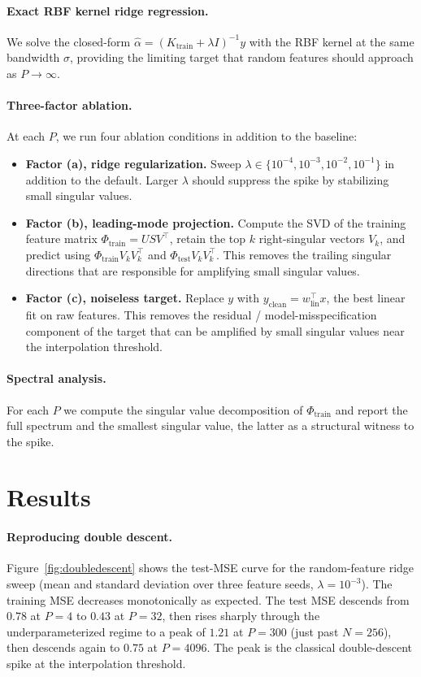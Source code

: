 \documentclass{article}
\begin{document}
\paragraph{Exact RBF kernel ridge regression.}
We solve the closed-form $\hat{\alpha} = (K_{\text{train}} + \lambda I)^{-1} y$ with the RBF kernel at the same bandwidth $\sigma$, providing the limiting target that random features should approach as $P \to \infty$.

\paragraph{Three-factor ablation.}
At each $P$, we run four ablation conditions in addition to the baseline:
\begin{itemize}
  \item \textbf{Factor (a), ridge regularization.} Sweep $\lambda \in \{10^{-4}, 10^{-3}, 10^{-2}, 10^{-1}\}$ in addition to the default. Larger $\lambda$ should suppress the spike by stabilizing small singular values.
  \item \textbf{Factor (b), leading-mode projection.} Compute the SVD of the training feature matrix $\Phi_{\text{train}} = U S V^\top$, retain the top $k$ right-singular vectors $V_k$, and predict using $\Phi_{\text{train}} V_k V_k^\top$ and $\Phi_{\text{test}} V_k V_k^\top$. This removes the trailing singular directions that are responsible for amplifying small singular values.
  \item \textbf{Factor (c), noiseless target.} Replace $y$ with $y_{\text{clean}} = w_{\text{lin}}^\top x$, the best linear fit on raw features. This removes the residual / model-misspecification component of the target that can be amplified by small singular values near the interpolation threshold.
\end{itemize}

\paragraph{Spectral analysis.}
For each $P$ we compute the singular value decomposition of $\Phi_{\text{train}}$ and report the full spectrum and the smallest singular value, the latter as a structural witness to the spike.

\section{Results}

\paragraph{Reproducing double descent.}
Figure~\ref{fig:doubledescent} shows the test-MSE curve for the random-feature ridge sweep (mean and standard deviation over three feature seeds, $\lambda = 10^{-3}$). The training MSE decreases monotonically as expected. The test MSE descends from $0.78$ at $P = 4$ to $0.43$ at $P = 32$, then rises sharply through the underparameterized regime to a peak of $1.21$ at $P = 300$ (just past $N = 256$), then descends again to $0.75$ at $P = 4096$. The peak is the classical double-descent spike at the interpolation threshold.
\end{document}
